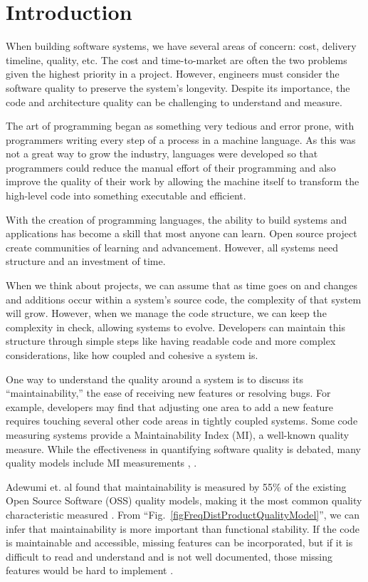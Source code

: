 \chapter{Introduction} \label{sectionIntroduction}

When building software systems, we have several areas of concern: cost, delivery timeline, quality, etc. The cost and time-to-market are often the two problems given the highest priority in a project. However, engineers must consider the software quality to preserve the system's longevity. Despite its importance, the code and architecture quality can be challenging to understand and measure.

The art of programming began as something very tedious and error prone, with programmers writing every step of a process in a machine language. As this was not a great way to grow the industry, languages were developed so that programmers could reduce the manual effort of their programming and also improve the quality of their work by allowing the machine itself to transform the high-level code into something executable and efficient. \cite{lehman:1980}

With the creation of programming languages, the ability to build systems and applications has become a skill that most anyone can learn. Open source project create communities of learning and advancement. However, all systems need structure and an investment of time.

When we think about projects, we can assume that as time goes on and changes and additions occur within a system's source code, the complexity of that system will grow. However, when we manage the code structure, we can keep the complexity in check, allowing systems to evolve. Developers can maintain this structure through simple steps like having readable code and more complex considerations, like how coupled and cohesive a system is.

One way to understand the quality around a system is to discuss its ``maintainability,'' the ease of receiving new features or resolving bugs. For example, developers may find that adjusting one area to add a new feature requires touching several other code areas in tightly coupled systems. Some code measuring systems provide a Maintainability Index (MI), a well-known quality measure. While the effectiveness in quantifying software quality is debated, many quality models include MI measurements \cite{vandeursen:2014}, \cite{adewumi:2016}. 

Adewumi et. al found that maintainability is measured by 55\% of the existing Open Source Software (OSS) quality models, making it the most common quality characteristic measured \cite{adewumi:2016}. From ``Fig.~\ref{figFreqDistProductQualityModel}'', we can infer that maintainability is more important than functional stability. If the code is maintainable and accessible, missing features can be incorporated, but if it is difficult to read and understand and is not well documented, those missing features would be hard to implement \cite{adewumi:2016}.

